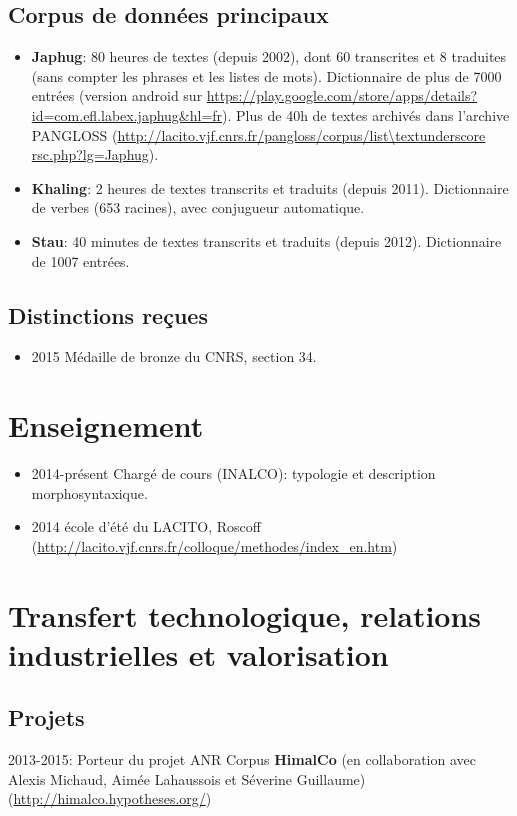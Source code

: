 \documentclass[oldfontcommands,oneside,a4paper,11pt]{article}
\begin{document}
\subsection{Corpus de données principaux}
\begin{itemize}
\item \textbf{Japhug}: 80 heures de textes (depuis 2002), dont 60 transcrites et 8 traduites (sans compter les phrases et les listes de mots). Dictionnaire de plus de 7000 entrées (version android sur \url{https://play.google.com/store/apps/details?id=com.efl.labex.japhug&hl=fr}). Plus de 40h de textes archivés dans l'archive PANGLOSS (\url{http://lacito.vjf.cnrs.fr/pangloss/corpus/list\textunderscore rsc.php?lg=Japhug}).
\item \textbf{Khaling}: 2 heures de textes transcrits et traduits (depuis 2011). Dictionnaire de verbes (653 racines), avec conjugueur automatique.
\item \textbf{Stau}: 40 minutes de textes transcrits et traduits (depuis 2012). Dictionnaire de 1007 entrées.
  \end{itemize}
  
\subsection{Distinctions reçues}  
\begin{itemize}
\item 2015 Médaille de bronze du CNRS, section 34.
\end{itemize}
  
\section{Enseignement}
\begin{itemize}
\item 2014-présent Chargé de cours (INALCO): typologie et description morphosyntaxique.
\item 2014 école d'été du LACITO, Roscoff (\url{http://lacito.vjf.cnrs.fr/colloque/methodes/index\_en.htm})
\end{itemize}

\section{Transfert technologique, relations industrielles et valorisation}

\subsection{Projets}
2013-2015: Porteur du projet ANR Corpus \textbf{HimalCo} (en collaboration avec Alexis Michaud, Aimée Lahaussois et Séverine Guillaume) (\url{http://himalco.hypotheses.org/})
\end{document}
